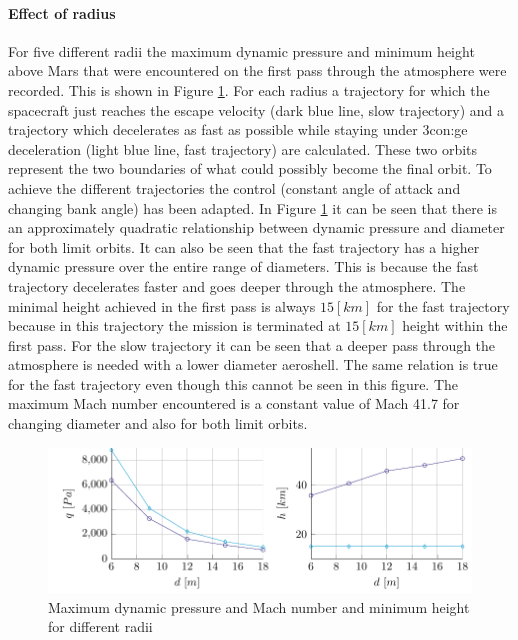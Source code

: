 \paragraph{Effect of radius}
For five different radii the maximum dynamic pressure and minimum height above Mars that were encountered on the first pass through the atmosphere were recorded. This is shown in Figure \ref{fig:radius}. For each radius a trajectory for which the spacecraft just reaches the escape velocity (dark blue line, slow trajectory) and a trajectory which decelerates as fast as possible while staying under 3\gls{con:ge} deceleration (light blue line, fast trajectory) are calculated. These two orbits represent the two boundaries of what could possibly become the final orbit. To achieve the different trajectories the control (constant angle of attack and changing bank angle) has been adapted. In Figure \ref{fig:radius} it can be seen that there is an approximately quadratic relationship between dynamic pressure and diameter for both limit orbits. It can also be seen that the fast trajectory has a higher dynamic pressure over the entire range of diameters. This is because the fast trajectory decelerates faster and goes deeper through the atmosphere. The minimal height achieved in the first pass is always $15 \left[km\right]$ for the fast trajectory because in this trajectory the mission is terminated at $15 \left[km\right]$ height within the first pass. For the slow trajectory it can be seen that a deeper pass through the atmosphere is needed with a lower diameter aeroshell. The same relation is true for the fast trajectory even though this cannot be seen in this figure. The maximum Mach number encountered is a constant value of Mach 41.7 for changing diameter and also for both limit orbits.

\begin{figure}[h]
	\centering
	\includegraphics[width=\textwidth]{./Figure/orbit/radius_param2.pdf}
	\caption{Maximum dynamic pressure and Mach number and minimum height for different radii}
	\label{fig:radius}
\end{figure}

